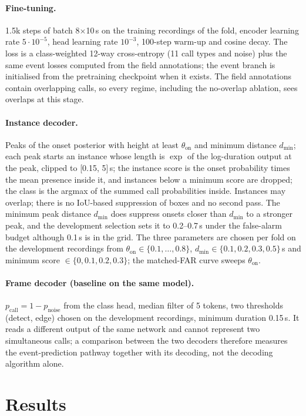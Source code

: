 \documentclass[10pt,twocolumn]{article}
\begin{document}
\paragraph{Fine-tuning.} 1.5k steps of batch 8$\times$10\,s on the training recordings of the fold, encoder learning rate $5\cdot10^{-5}$, head learning rate $10^{-3}$, 100-step warm-up and cosine decay. The loss is a class-weighted 12-way cross-entropy (11 call types and noise) plus the same event losses computed from the field annotations; the event branch is initialised from the pretraining checkpoint when it exists. The field annotations contain overlapping calls, so every regime, including the no-overlap ablation, sees overlaps at this stage.
\paragraph{Instance decoder.} Peaks of the onset posterior with height at least $\theta_{\mathrm{on}}$ and minimum distance $d_{\min}$; each peak starts an instance whose length is $\exp$ of the log-duration output at the peak, clipped to [0.15, 5]\,s; the instance score is the onset probability times the mean presence inside it, and instances below a minimum score are dropped; the class is the argmax of the summed call probabilities inside. Instances may overlap; there is no IoU-based suppression of boxes and no second pass. The minimum peak distance $d_{\min}$ does suppress onsets closer than $d_{\min}$ to a stronger peak, and the development selection sets it to 0.2--0.7\,s under the false-alarm budget although 0.1\,s is in the grid. The three parameters are chosen per fold on the development recordings from $\theta_{\mathrm{on}}\in\{0.1,\dots,0.8\}$, $d_{\min}\in\{0.1,0.2,0.3,0.5\}$\,s and minimum score $\in\{0,0.1,0.2,0.3\}$; the matched-FAR curve sweeps $\theta_{\mathrm{on}}$.
\paragraph{Frame decoder (baseline on the same model).} $p_{\mathrm{call}}=1-p_{\mathrm{noise}}$ from the class head, median filter of 5 tokens, two thresholds (detect, edge) chosen on the development recordings, minimum duration 0.15\,s. It reads a different output of the same network and cannot represent two simultaneous calls; a comparison between the two decoders therefore measures the event-prediction pathway together with its decoding, not the decoding algorithm alone.

\section{Results}
\label{sec:results}
\end{document}
